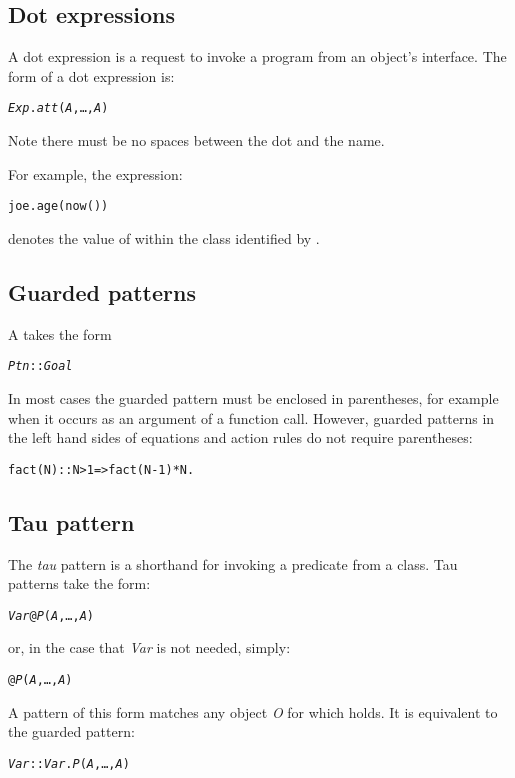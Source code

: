 \subsection{Dot expressions}
\label{expression:dot}

A dot expression is a request to invoke a program from an object's interface. The form of a dot expression is:
\begin{alltt}
\emph{Exp}.\emph{att}(\emph{A},\ldots,\emph{A\subn})
\end{alltt}
Note there must be no spaces between the dot and the  name.

For example, the expression:
\begin{alltt}
joe.age(now())
\end{alltt}
denotes the value of  within the class identified by .

\subsection{Guarded patterns}
\label{patterns:guard}

A  takes the form
\begin{alltt}
\emph{Ptn}::\emph{Goal}
\end{alltt}
In most cases the guarded pattern must be enclosed in parentheses, for example when it occurs as an argument of a  function call. However, guarded patterns in the left hand sides of equations and action rules do not require parentheses:
\begin{alltt}
fact(N)::N>1 => fact(N-1)*N.
\end{alltt}

\subsection{Tau pattern}
\label{expression:tau}

The \emph{tau} pattern is a shorthand for invoking a predicate from a class. Tau patterns take the form:
\begin{alltt}
\emph{Var}@\emph{P}(\emph{A},\ldots,\emph{A\subn})
\end{alltt}
or, in the case that \emph{Var} is not needed, simply:
\begin{alltt}
@\emph{P}(\emph{A},\ldots,\emph{A\subn})
\end{alltt}
A pattern of this form matches any object \emph{O} for which  holds. It is equivalent to the guarded pattern:
\begin{alltt}
\emph{Var}::\emph{Var}.\emph{P}(\emph{A},\ldots,\emph{A\subn})
\end{alltt}

